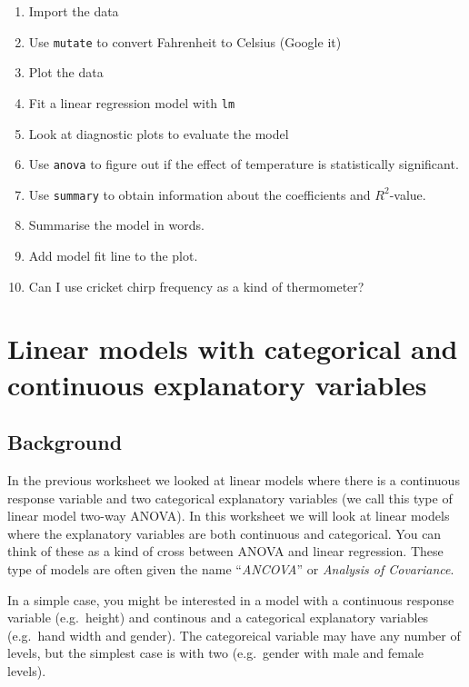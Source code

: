\documentclass[
  a4paperpaper,
]{book}
\begin{document}
\begin{enumerate}
\def\labelenumi{\arabic{enumi})}
\item
  Import the data
\item
  Use \texttt{mutate} to convert Fahrenheit to Celsius (Google it)
\item
  Plot the data
\item
  Fit a linear regression model with \texttt{lm}
\item
  Look at diagnostic plots to evaluate the model
\item
  Use \texttt{anova} to figure out if the effect of temperature is statistically significant.
\item
  Use \texttt{summary} to obtain information about the coefficients and \(R^2\)-value.
\item
  Summarise the model in words.
\item
  Add model fit line to the plot.
\item
  Can I use cricket chirp frequency as a kind of thermometer?
\end{enumerate}

\hypertarget{linear-models-with-categorical-and-continuous-explanatory-variables}{%
\chapter{Linear models with categorical and continuous explanatory variables}\label{linear-models-with-categorical-and-continuous-explanatory-variables}}

\hypertarget{background}{%
\section{Background}\label{background}}

In the previous worksheet we looked at linear models where there is a continuous response variable and two categorical explanatory variables (we call this type of linear model two-way ANOVA). In this worksheet we will look at linear models where the explanatory variables are both continuous and categorical. You can think of these as a kind of cross between ANOVA and linear regression. These type of models are often given the name ``\emph{ANCOVA}'' or \emph{Analysis of Covariance}.

In a simple case, you might be interested in a model with a continuous response variable (e.g.~height) and continous and a categorical explanatory variables (e.g.~hand width and gender). The categoreical variable may have any number of levels, but the simplest case is with two (e.g.~gender with male and female levels).
\end{document}
